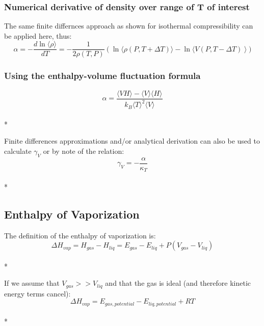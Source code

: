 \documentclass[aps,pre,twocolumn,nofootinbib,superscriptaddress,linenumbers,10pt, draft,tightenlines]{revtex4-1}
\begin{document}
\subsubsection{Numerical derivative of density over range of T of interest}
The same finite differnces approach as shown for isothermal compressibility can be applied here, thus:
\begin{equation}\alpha = -\frac{d\ln\langle \rho \rangle}{dT} = -\frac{1}{2\rho(T,P)} \left(\ln \langle \rho(P,T+\Delta T)\rangle - \ln \langle V(P,T-\Delta T)\right\rangle) \end{equation}
\subsubsection{Using the enthalpy-volume fluctuation formula}
\begin{equation}\alpha = \frac{\langle VH \rangle - \langle V \rangle \langle H \rangle}{k_B \langle T \rangle^2 \langle V \rangle}\end{equation}\\*

Finite differences approximations and/or analytical derivation can also be used to calculate $\gamma_V$ or by note of the relation:
\begin{equation}\gamma_V = - \frac{\alpha}{\kappa_T}\end{equation}\\*

\subsection{Enthalpy of Vaporization}

The definition of the enthalpy of vaporization is\cite{hvap}:
\begin{equation}\Delta H_{vap} = H_{gas} - H_{liq} = E_{gas} - E_{liq} + P(V_{gas} - V_{liq})\end{equation}\\*

If we assume that $V_{gas} >> V_{liq}$ and that the gas is ideal (and therefore kinetic energy terms cancel):
\begin{equation}\Delta H_{vap} = E_{gas, potential} - E_{liq, potential} + R T\end{equation}\\*
\end{document}
